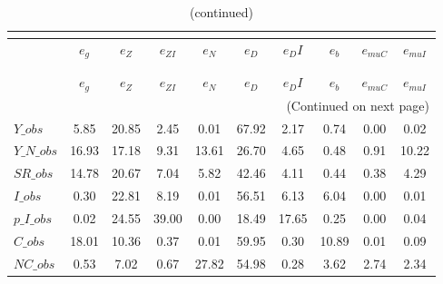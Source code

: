  
\begin{center}
\begin{longtable}{lccccccccc} 
\caption{VARIANCE DECOMPOSITION (in percent)}\\
 \label{Table:th_var_decomp_uncond}\\
\toprule 
$               $	 & 	 $        {e_g}$	 & 	 $        {e_Z}$	 & 	 $     {e_{ZI}}$	 & 	 $        {e_N}$	 & 	 $        {e_D}$	 & 	 $       {e_DI}$	 & 	 $        {e_b}$	 & 	 $    {e_{muC}}$	 & 	 $    {e_{muI}}$\\
\midrule \endfirsthead 
\caption{(continued)}\\
 \toprule \\ 
$               $	 & 	 $        {e_g}$	 & 	 $        {e_Z}$	 & 	 $     {e_{ZI}}$	 & 	 $        {e_N}$	 & 	 $        {e_D}$	 & 	 $       {e_DI}$	 & 	 $        {e_b}$	 & 	 $    {e_{muC}}$	 & 	 $    {e_{muI}}$\\
\midrule \endhead 
\midrule \multicolumn{10}{r}{(Continued on next page)} \\ \bottomrule \endfoot 
\bottomrule \endlastfoot 
$Y\_obs         $	 & 	         5.85	 & 	        20.85	 & 	         2.45	 & 	         0.01	 & 	        67.92	 & 	         2.17	 & 	         0.74	 & 	         0.00	 & 	         0.02 \\ 
$Y\_N\_obs      $	 & 	        16.93	 & 	        17.18	 & 	         9.31	 & 	        13.61	 & 	        26.70	 & 	         4.65	 & 	         0.48	 & 	         0.91	 & 	        10.22 \\ 
$SR\_obs        $	 & 	        14.78	 & 	        20.67	 & 	         7.04	 & 	         5.82	 & 	        42.46	 & 	         4.11	 & 	         0.44	 & 	         0.38	 & 	         4.29 \\ 
$I\_obs         $	 & 	         0.30	 & 	        22.81	 & 	         8.19	 & 	         0.01	 & 	        56.51	 & 	         6.13	 & 	         6.04	 & 	         0.00	 & 	         0.01 \\ 
$p\_I\_obs      $	 & 	         0.02	 & 	        24.55	 & 	        39.00	 & 	         0.00	 & 	        18.49	 & 	        17.65	 & 	         0.25	 & 	         0.00	 & 	         0.04 \\ 
$C\_obs         $	 & 	        18.01	 & 	        10.36	 & 	         0.37	 & 	         0.01	 & 	        59.95	 & 	         0.30	 & 	        10.89	 & 	         0.01	 & 	         0.09 \\ 
$NC\_obs        $	 & 	         0.53	 & 	         7.02	 & 	         0.67	 & 	        27.82	 & 	        54.98	 & 	         0.28	 & 	         3.62	 & 	         2.74	 & 	         2.34 \\ 

\end{longtable}
\end{center}
